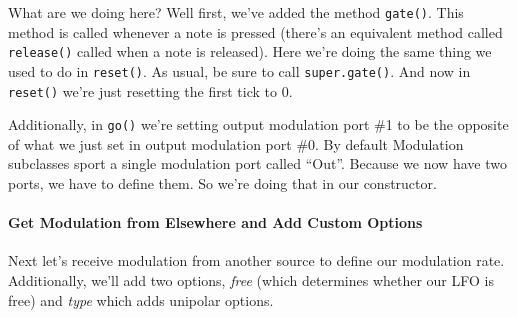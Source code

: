 \documentclass{article}
\begin{document}
What are we doing here?  Well first, we've added the method {\tt gate()}.  This method is called whenever a note is pressed (there's an equivalent method called {\tt release()} called when a note is released).  Here we're doing the same thing we used to do in {\tt reset()}.  As usual, be sure to call {\tt super.gate()}.  And now in {\tt reset()} we're just resetting the first tick to 0.

Additionally, in {\tt go()} we're setting output modulation port \#1 to be the opposite of what we just set in output modulation port \#0.  By default Modulation subclasses sport a single modulation port called ``Out''.  Because we now have two ports, we have to define them.  So we're doing that in our constructor.

\paragraph{Get Modulation from Elsewhere and Add Custom Options}
Next let's receive modulation from another source to define our modulation rate.  Additionally, we'll add two options, {\it free} (which determines whether our LFO is free) and {\it type} which adds unipolar options.
\end{document}
